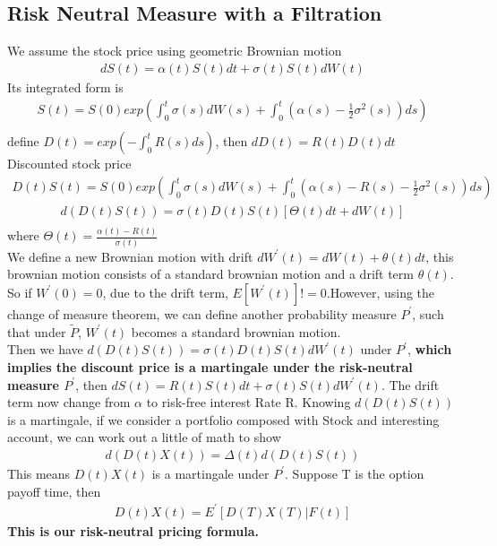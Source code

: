 \documentclass[a4paper]{article}
\begin{document}
\subsection{Risk Neutral Measure with a Filtration}
We assume the stock price using geometric Brownian motion\\
\begin{align*}
dS(t) = \alpha(t) S(t) dt + \sigma(t) S(t) d W(t)
\end{align*}
Its integrated form is\\
\begin{align*}
	S(t) = S(0) exp(\int _0 ^t \sigma(s) dW(s) + \int _0 ^t (\alpha(s) - \frac{1}{2} \sigma^2(s)) ds)\\
\end{align*}
define $D(t) = exp(-\int_0^t R(s) ds) $, then $dD(t) = R(t)D(t)dt$\\
Discounted stock price\\
\begin{align*}
	D(t)S(t) = S(0) exp(\int_0^t \sigma(s) dW(s) + \int_0^t (\alpha(s) - R(s) - \frac{1}{2} \sigma^2(s)) ds)
\end{align*}
\begin{align*}
	d(D(t) S(t)) = \sigma(t) D(t) S(t) [\Theta(t) dt + dW(t)]\\
\end{align*}
where $\Theta(t) = \frac{\alpha(t) -R(t)}{\sigma(t)}$\\
We define a new Brownian motion with drift $dW^{'}(t) = dW(t) + \theta(t) dt$, this brownian motion consists of a standard brownian motion and a drift term $\theta(t)$. So if $W^{'}(0) = 0$, due to the drift term, $E[W^{'}(t)] != 0$.However, using the change of measure theorem, we can define another probability measure $P^{'}$, such that under $\tilde P$, $W^{'}(t)$ becomes a standard brownian motion.\\
Then we have $d(D(t)S(t)) = \sigma(t) D(t) S(t) dW^{'}(t)$ under $P^{'}$, {\bf which implies the discount price is a martingale under the risk-neutral measure $P^{'}$}, then $dS(t) = R(t) S(t) dt + \sigma(t) S(t) d  W^{'}(t)$. The drift term now change from $\alpha$ to risk-free interest Rate R. Knowing $d(D(t)S(t))$ is a martingale, if we consider a portfolio composed with Stock and interesting account, we can work out a little of math to show
\begin{align*}
	d(D(t)X(t)) = \Delta(t) d(D(t)S(t))
\end{align*}
This means $D(t)X(t)$ is a martingale under $P^{'}$. Suppose T is the option payoff time, then 
\begin{align*}
	D(t)X(t) = E^{'} [D(T) X(T) | F(t)]
\end{align*}
{\bf This is our risk-neutral pricing formula.}
\end{document}
